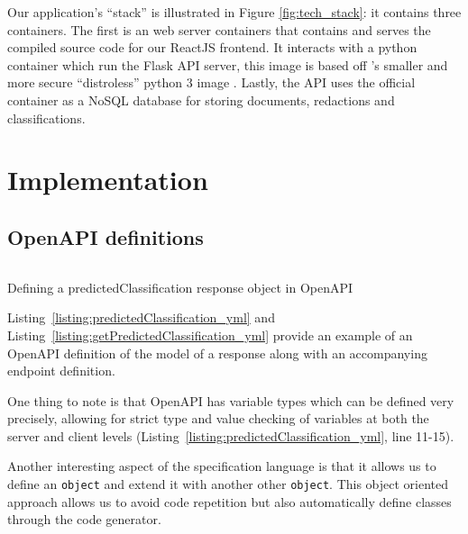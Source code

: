 \documentclass[\version]{l4proj}
\begin{document}
Our application's ``stack'' is illustrated in Figure \ref{fig:tech_stack}: it contains three containers.
The first is an \textcite{NGINX2020} web server containers that contains and serves the compiled source code for our ReactJS frontend.
It interacts with a python container which run the Flask API server, this image is based off \textcite{GoogleContainerToolsDistroless2020}'s smaller and more secure ``distroless'' python 3 image \autocite{mooreDistrolessDockerContainerizing2017}.
Lastly, the API uses the official \textcite{MongoDB2020} container as a NoSQL database for storing documents, redactions and classifications.

\chapter{Implementation}





\section{OpenAPI definitions}

\begin{listing}[H]
    \inputminted{yaml}{code/predictedClassification.yml}
    \caption{Defining a predictedClassification response object in OpenAPI}\label{listing:predictedClassification_yml}
\end{listing}

Listing~\ref{listing:predictedClassification_yml} and Listing~\ref{listing:getPredictedClassification_yml} provide an example of an OpenAPI definition of the model of a response along with an accompanying endpoint definition.

One thing to note is that OpenAPI has variable types which can be defined very precisely, allowing for strict type and value checking of variables at both the server and client levels (Listing~\ref{listing:predictedClassification_yml}, line 11-15).

Another interesting aspect of the specification language is that it allows us to define an \verb|object| and extend it with another other \verb|object|.
This object oriented approach allows us to avoid code repetition but also automatically define classes through the code generator.
\end{document}
